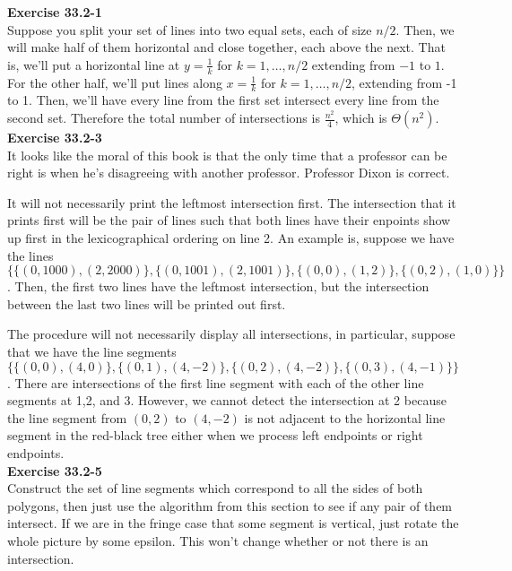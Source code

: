 \documentclass{article}
\begin{document}
\noindent\textbf{Exercise 33.2-1}\\

Suppose you split your set of lines into two equal sets, each of size $n/2$. Then, we will make half of them horizontal and close together, each above the next. That is, we'll put a horizontal line at $y = \frac{1}{k}$ for $k=1,\ldots, n/2$ extending from $-1$ to $1$. For the other half, we'll put lines along $x= \frac{1}{k}$ for $k=1,\ldots,n/2$, extending from -1 to 1. Then, we'll have every line from the first set intersect every line from the second set. Therefore the total number of intersections is $\frac{n^2}{4}$, which is $\Theta(n^2)$.\\



\noindent\textbf{Exercise 33.2-3}\\

It looks like the moral of this book is that the only time that a professor can be right is when he's disagreeing with another professor. Professor Dixon is correct.

It will not necessarily print the leftmost intersection first. The intersection that it prints first will be the pair of lines such that both lines have their enpoints show up first in the lexicographical ordering on line 2. An example is, suppose we have the lines $\{\{(0,1000),(2,2000)\},\{(0,1001),(2,1001)\},\{(0,0),(1,2)\},\{(0,2),(1,0)\}\}$. Then, the first two lines have the leftmost intersection, but the intersection between the last two lines will be printed out first.

The procedure will not necessarily display all intersections, in particular, suppose that we have the line segments $\{\{(0,0),(4,0)\},\{(0,1),(4,-2)\},\{(0,2),(4,-2)\},\{(0,3),(4,-1)\}\}$. There are intersections of the first line segment with each of the other line segments at 1,2, and 3. However, we cannot detect the intersection at 2 because the line segment from $(0,2)$ to $(4,-2)$ is not adjacent to the horizontal line segment in the red-black tree either when we process left endpoints or right endpoints.\\



\noindent\textbf{Exercise 33.2-5}\\
Construct the set of line segments which correspond to all the sides of both polygons, then just use the algorithm from this section to see if any pair of them intersect. If we are in the fringe case that some segment is vertical, just rotate the whole picture by some epsilon. This won't change whether or not there is an intersection.\\
\end{document}
